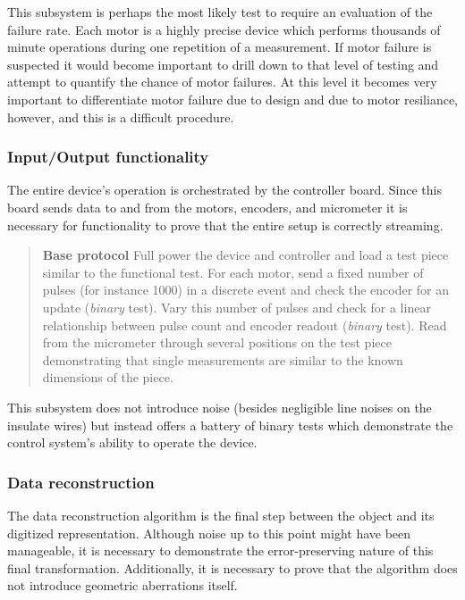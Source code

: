 \documentclass{article}
\begin{document}
This subsystem is perhaps the most likely test to require an evaluation of the failure rate. Each motor is a highly precise device which performs thousands of minute operations during one repetition of a measurement. If motor failure is suspected it would become important to drill down to that level of testing and attempt to quantify the chance of motor failures. At this level it becomes very important to differentiate motor failure due to design and due to motor resiliance, however, and this is a difficult procedure.

\subsubsection{Input/Output functionality}
The entire device's operation is orchestrated by the controller board. Since this board sends data to and from the motors, encoders, and micrometer it is necessary for functionality to prove that the entire setup is correctly streaming.

\begin{quotation}
  \textbf{Base protocol} Full power the device and controller and load   a test piece similar to the functional test. For each motor, send a   fixed number of pulses (for instance 1000) in a discrete event and   check the encoder for an update (\textit{binary} test). Vary this   number of pulses and check for a linear relationship between pulse   count and encoder readout (\textit{binary} test). Read from the   micrometer through several positions on the test piece demonstrating   that single measurements are similar to the known dimensions of the   piece.
\end{quotation}

This subsystem does not introduce noise (besides negligible line noises on the insulate wires) but instead offers a battery of binary tests which demonstrate the control system's ability to operate the device.

\subsubsection{Data reconstruction}
The data reconstruction algorithm is the final step between the object and its digitized representation. Although noise up to this point might have been manageable, it is necessary to demonstrate the error-preserving nature of this final transformation. Additionally, it is necessary to prove that the algorithm does not introduce geometric aberrations itself.
\end{document}
